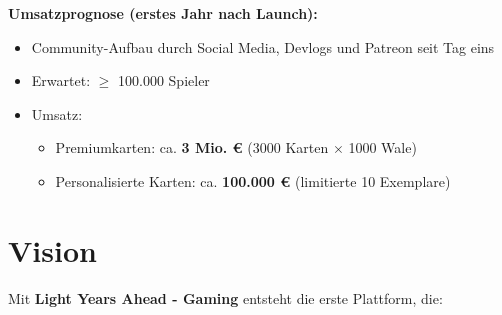 \documentclass[fontsize=12]{scrartcl}
\begin{document}
	\textbf{Umsatzprognose (erstes Jahr nach Launch):}
	
	\begin{itemize}
		
		\item Community-Aufbau durch Social Media, Devlogs und Patreon seit Tag eins
		
		\item Erwartet: \(\geq\) 100.000 Spieler
		
		
		\item Umsatz:
		
			\begin{itemize}
				
				\item Premiumkarten: ca. \textbf{3 Mio. €} (3000 Karten \(\times\) 1000 Wale)
				
				\item Personalisierte Karten: ca. \textbf{100.000 €} (limitierte 10 Exemplare)
				
			\end{itemize}
		
	\end{itemize}
	
	
	\section{Vision} \label{sec:Vision}
	
	Mit \textbf{Light Years Ahead - Gaming} entsteht die erste Plattform, die:
	
\end{document}
